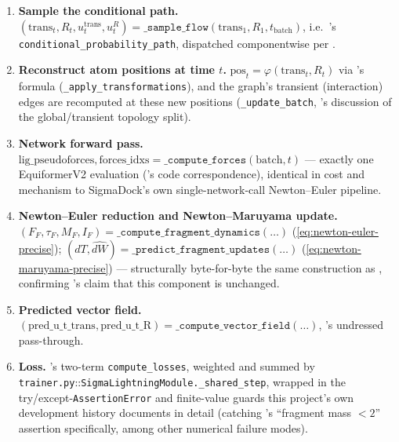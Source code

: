 \documentclass[11pt,a4paper]{report}
\theoremstyle{definition}
\theoremstyle{remark}
\newcommand{\pyfunc}[1]{\texttt{#1}}
\begin{document}
\begin{enumerate}
counterpart requirement in the theory of
, which permit --- but do not
require --- an independent $t$ per component; the code's own inline
comment flags this exact choice as a documented, unresolved limitation:
``better sampling. Uniform makes noises (sigmas) that are too
redundant'').
\item \textbf{Sample the conditional path.}
$(\mathrm{trans}_t,R_t,u_t^{\mathrm{trans}},u_t^R) = \pyfunc{\_sample\_flow}(\mathrm{trans}_1,R_1,t_{\mathrm{batch}})$,
i.e.\ 's
\pyfunc{conditional\_probability\_path}, dispatched componentwise per
.
\item \textbf{Reconstruct atom positions at time $t$.}
$\mathrm{pos}_t = \varphi(\mathrm{trans}_t,R_t)$ via
's formula
(\pyfunc{\_apply\_transformations}), and the graph's transient (interaction)
edges are recomputed at these new positions
(\pyfunc{\_update\_batch}, 's discussion of the
global/transient topology split).
\item \textbf{Network forward pass.}
$\mathrm{lig\_pseudoforces},\mathrm{forces\_idxs} = \pyfunc{\_compute\_forces}(\mathrm{batch},t)$
--- exactly one EquiformerV2 evaluation
('s code correspondence),
identical in cost and mechanism to SigmaDock's own single-network-call
Newton--Euler pipeline.
\item \textbf{Newton--Euler reduction and Newton--Maruyama update.}
$(F_F,\tau_F,M_F,I_F) = \pyfunc{\_compute\_fragment\_dynamics}(\dots)$
(\eqref{eq:newton-euler-precise}); $(dT,\widehat{dW})=\pyfunc{\_predict\_fragment\_updates}(\dots)$
(\eqref{eq:newton-maruyama-precise}) --- structurally byte-for-byte the
same construction as , confirming
's claim that this component is
unchanged.
\item \textbf{Predicted vector field.}
$(\mathrm{pred\_u\_t\_trans},\mathrm{pred\_u\_t\_R}) = \pyfunc{\_compute\_vector\_field}(\dots)$,
's undressed pass-through.
\item \textbf{Loss.} 's two-term
\pyfunc{compute\_losses}, weighted and summed by
\pyfunc{trainer.py}::\pyfunc{SigmaLightningModule.\_shared\_step}, wrapped
in the try/except-\texttt{AssertionError} and finite-value guards this
project's own development history documents in detail (catching
's ``fragment mass $<2$'' assertion
specifically, among other numerical failure modes).
\end{enumerate}
\end{document}
